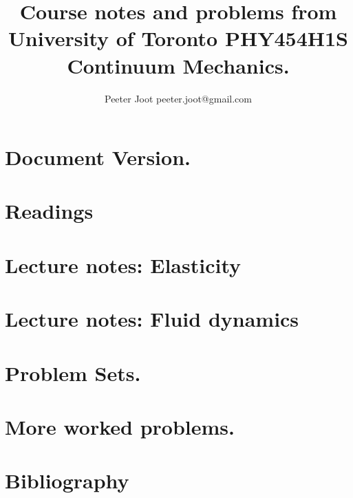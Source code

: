 \documentclass[12pt,leqno]{book}
\begin{document}

\title{Course notes and problems from\\University of Toronto PHY454H1S\\Continuum Mechanics.}
\author{Peeter Joot \quad peeter.joot@gmail.com}

\maketitle

\clearpage{}
\tableofcontents

\clearpage{}

\pagestyle{plain}



\part{Document Version.}


\part{Readings}


\part{Lecture notes: Elasticity}








\part{Lecture notes: Fluid dynamics}







\part{Problem Sets.}

\part{More worked problems.}



%
\part{Bibliography}




\end{document}
